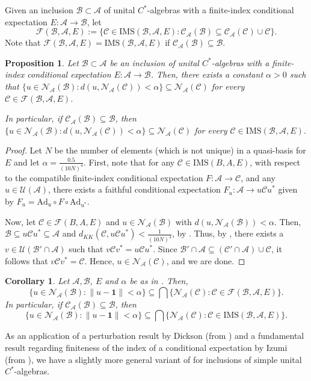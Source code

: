 \documentclass{amsart}
\numberwithin{equation}{section}
\newcommand{\IMS}{\mathrm{IMS}}
\newcommand{\mcal}{\mathcal}
\newcommand{\1}{\mathbf{1}}
\newcommand{\mU}{\mathcal{U}}
\newcommand{\mA}{\mathcal{A}}
\newcommand{\mB}{\mathcal{B}}
\newcommand{\mC}{\mathcal{C}}
\newcommand{\mN}{\mathcal{N}}
\newtheorem{cor}[theorem]{Corollary}
\newtheorem{proposition}[theorem]{Proposition}
\begin{document}
 Given an inclusion $\mB \subset \mA$ of
unital $C^*$-algebras with a finite-index conditional expectation $E:
\mA \to \mB$, let
\begin{equation}\label{FBAE-expression}
    \mathcal{F}(\mB,\mA, E) :=\big\{ \mC \in \IMS(\mB, \mA, E):
\mC_{\mA}(\mB) \subseteq \mC_{\mA}(\mC) \cup \mC\big\}.
\end{equation}
Note that $\mcal{F}(\mB, \mA, E) = \IMS(\mB, \mA, E)$ if
$\mC_{\mA}(\mB) \subseteq \mB$.

\begin{proposition}\label{u-close-to-normalizer}
Let $\mB \subset \mA$ be an inclusion of unital $C^*$-algebras with a
finite-index conditional expectation $E: \mA \to \mB$. Then, there
exists a constant $\alpha > 0$  such that
\(
\big\{ u \in {\mN}_{\mA}(\mB): d(u, \mN_{\mA}(\mC)) < \alpha \big\} \subseteq
 \mN_{\mA}(\mC)\) for every $\mC \in \mcal{F}(\mB, \mA, E)$.

In particular, if $\mC_{\mA}(\mB) \subseteq \mB$, then
\(
\big\{ u \in {\mN}_{\mA}(\mB): d(u, \mN_{\mA}(\mC)) < \alpha \big\} \subseteq
 \mN_{\mA}(\mC)\) for every $\mC \in \IMS(\mB, \mA, E)$.
\end{proposition}

\begin{proof}
Let $N$ be the number of elements (which is not unique) in a
quasi-basis for $E$ and let $\alpha = \frac{0.5}{(10 N)^4}$. First,
note that for any $\mC \in \IMS(B, A, E)$, with respect to the compatible
finite-index conditional expectation $F: \mA \to \mC$, and any  $u \in
\mU(\mA)$, there exists a faithful conditional expectation $F_u: \mA
\to u\mC u^*$ given by $F_u = \mathrm{Ad}_u \circ F \circ
\mathrm{Ad}_{u^{*}}$.

Now, let $\mC \in \mcal{F}(B, A, E)$ and $u \in \mN_{\mA}(\mB)$ with
$d( u, \mN_{\mA}(\mB)) < \alpha$. Then, $\mB \subseteq u \mC u^* \subseteq \mA $
and $d_{KK}(\mC, u \mC u^*) < \frac{1}{(10 N )^4}$, by
.  Thus, by \cite[Proposition 3.6]{IW}, there
exists a $v \in \mU(\mB'\cap \mA)$ such that $v \mC v^* = u \mC
u^*$. Since $\mB'\cap \mA \subseteq (\mC'\cap \mA) \cup \mC$, it
follows that $v \mC v^* = \mC$. Hence, $u \in \mN_{\mA}(\mC)$, and we
are done.
\end{proof}
\begin{cor}\label{u-in-normalizer}
Let $\mA, \mB$, $E$ and $\alpha$ be as in . Then,
\[
\big\{ u \in {\mN}_{\mA}(\mB): \|u - \1\| < \alpha\big\} \subseteq
\bigcap \Big\{ \mN_{\mA}(\mC): \mC \in \mcal{F}(\mB, \mA, E)\Big\}.
\]
In particular, if $\mC_{\mA}(\mB) \subseteq \mB$, then
\[
\big\{ u \in {\mN}_{\mA}(\mB): \|u - \1\| < \alpha\big\} \subseteq
\bigcap \Big\{ \mN_{\mA}(\mC): \mC \in \IMS(\mB, \mA, E)\Big\}.
\]
  \end{cor}
As an application of a perturbation result by Dickson (from \cite{Dickson})
and a fundamental result regarding finiteness of the index of a
conditional expectation by Izumi (from \cite{I}), we have a slightly more
general variant of  for inclusions of
simple unital $C^*$-algebras. 
\end{document}
